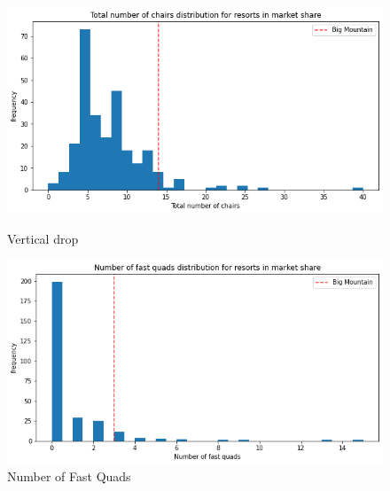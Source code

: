 \documentclass[twocolumn, 12pt]{article}
\begin{document}
\begin{figure}[!htb]
	\begin{minipage}{0.24\textwidth}
		\centering
		\includegraphics[width=\linewidth]{numberchairs.png}
		\caption{Vertical drop}\label{numberchairs}
	\end{minipage}\hfill
	\begin {minipage}{0.24\textwidth}
	\centering
	\includegraphics[width=\linewidth]{fastquads.png}
	\caption{Number of Fast Quads}\label{fastquads}
\end{minipage}
\end{figure}
\end{document}
